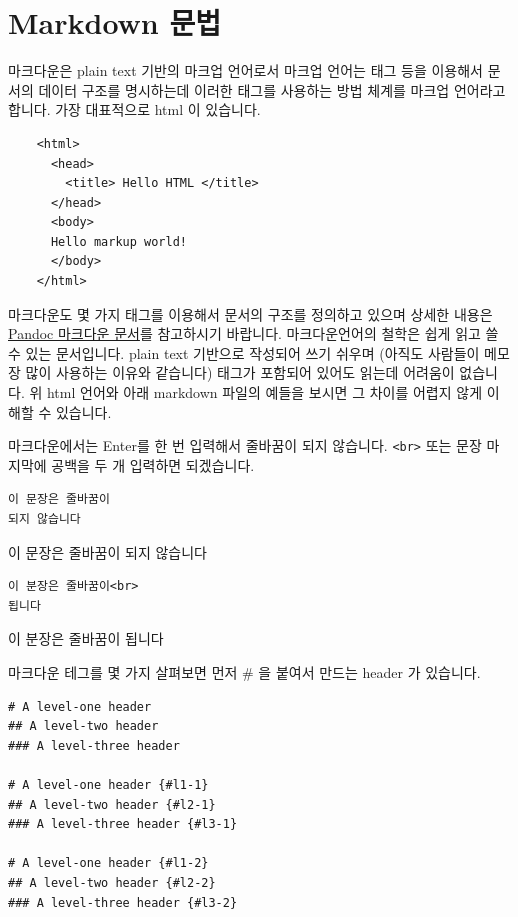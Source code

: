 \documentclass[
]{book}
\begin{document}
\hypertarget{markdown-uxbb38uxbc95}{%
\section{Markdown 문법}\label{markdown-uxbb38uxbc95}}

마크다운은 plain text 기반의 마크업 언어로서 마크업 언어는 태그 등을 이용해서 문서의 데이터 구조를 명시하는데 이러한 태그를 사용하는 방법 체계를 마크업 언어라고 합니다. 가장 대표적으로 html 이 있습니다.

\begin{verbatim}
    <html>
      <head>
        <title> Hello HTML </title>
      </head>
      <body>
      Hello markup world!
      </body>
    </html>
\end{verbatim}

마크다운도 몇 가지 태그를 이용해서 문서의 구조를 정의하고 있으며 상세한 내용은 \href{https://rmarkdown.rstudio.com/authoring_pandoc_markdown.html}{Pandoc 마크다운 문서}를 참고하시기 바랍니다. 마크다운언어의 철학은 쉽게 읽고 쓸 수 있는 문서입니다. plain text 기반으로 작성되어 쓰기 쉬우며 (아직도 사람들이 메모장 많이 사용하는 이유와 같습니다) 태그가 포함되어 있어도 읽는데 어려움이 없습니다. 위 html 언어와 아래 markdown 파일의 예들을 보시면 그 차이를 어렵지 않게 이해할 수 있습니다.

마크다운에서는 Enter를 한 번 입력해서 줄바꿈이 되지 않습니다. \texttt{\textless{}br\textgreater{}} 또는 문장 마지막에 공백을 두 개 입력하면 되겠습니다.

\begin{verbatim}
이 문장은 줄바꿈이 
되지 않습니다
\end{verbatim}

이 문장은 줄바꿈이
되지 않습니다

\begin{verbatim}
이 분장은 줄바꿈이<br>
됩니다
\end{verbatim}

이 분장은 줄바꿈이
됩니다

마크다운 테그를 몇 가지 살펴보면 먼저 \# 을 붙여서 만드는 header 가 있습니다.

\begin{verbatim}
# A level-one header
## A level-two header
### A level-three header

# A level-one header {#l1-1}
## A level-two header {#l2-1}
### A level-three header {#l3-1}

# A level-one header {#l1-2}
## A level-two header {#l2-2}
### A level-three header {#l3-2}
\end{verbatim}
\end{document}
